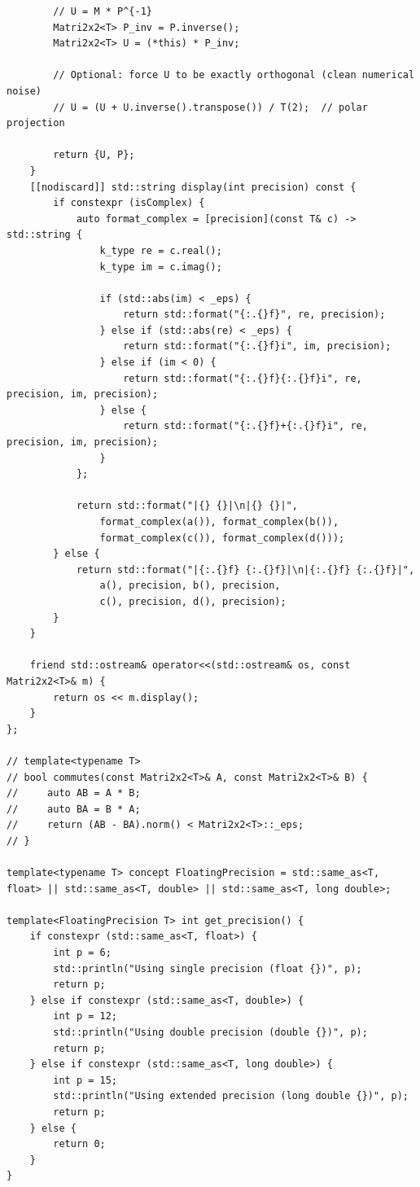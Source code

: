 \documentclass[11pt]{article}
\begin{document}
\begin{lstlisting}
        // U = M * P^{-1}
        Matri2x2<T> P_inv = P.inverse();
        Matri2x2<T> U = (*this) * P_inv;

        // Optional: force U to be exactly orthogonal (clean numerical noise)
        // U = (U + U.inverse().transpose()) / T(2);  // polar projection

        return {U, P};
    }
    [[nodiscard]] std::string display(int precision) const {
        if constexpr (isComplex) {
            auto format_complex = [precision](const T& c) -> std::string {
                k_type re = c.real();
                k_type im = c.imag();
                
                if (std::abs(im) < _eps) {
                    return std::format("{:.{}f}", re, precision);
                } else if (std::abs(re) < _eps) {
                    return std::format("{:.{}f}i", im, precision);
                } else if (im < 0) {
                    return std::format("{:.{}f}{:.{}f}i", re, precision, im, precision);
                } else {
                    return std::format("{:.{}f}+{:.{}f}i", re, precision, im, precision);
                }
            };
            
            return std::format("|{} {}|\n|{} {}|", 
                format_complex(a()), format_complex(b()),
                format_complex(c()), format_complex(d()));
        } else {
            return std::format("|{:.{}f} {:.{}f}|\n|{:.{}f} {:.{}f}|", 
                a(), precision, b(), precision, 
                c(), precision, d(), precision);
        }
    }

    friend std::ostream& operator<<(std::ostream& os, const Matri2x2<T>& m) {
        return os << m.display();
    }
};

// template<typename T>
// bool commutes(const Matri2x2<T>& A, const Matri2x2<T>& B) {
//     auto AB = A * B;
//     auto BA = B * A;
//     return (AB - BA).norm() < Matri2x2<T>::_eps;
// }

template<typename T> concept FloatingPrecision = std::same_as<T, float> || std::same_as<T, double> || std::same_as<T, long double>;

template<FloatingPrecision T> int get_precision() {
    if constexpr (std::same_as<T, float>) {
        int p = 6;
        std::println("Using single precision (float {})", p);
        return p;
    } else if constexpr (std::same_as<T, double>) {
        int p = 12;
        std::println("Using double precision (double {})", p);
        return p;
    } else if constexpr (std::same_as<T, long double>) {
        int p = 15;
        std::println("Using extended precision (long double {})", p);
        return p;
    } else {
        return 0;
    }
}


\end{lstlisting}
\end{document}
